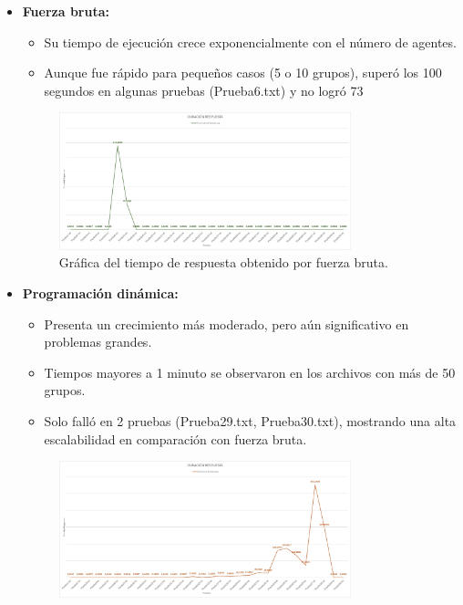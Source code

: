 \documentclass[11pt,letter]{article}
\begin{document}
    \begin{itemize}
        \item \textbf{Fuerza bruta:}
        \begin{itemize}
            \item Su tiempo de ejecución crece exponencialmente con el número de agentes.
            \item Aunque fue rápido para pequeños casos (5 o 10 grupos), superó los 100 segundos en algunas pruebas (Prueba6.txt) y no logró 73%
        \end{itemize}
        \begin{figure}[H]
            \centering
            \includegraphics[width=0.8\textwidth]{resources/tiempo2.jpeg}
            \caption{Gráfica del tiempo de respuesta obtenido por fuerza bruta.}
        \end{figure}
        \item \textbf{Programación dinámica:}
        \begin{itemize}
            \item Presenta un crecimiento más moderado, pero aún significativo en problemas grandes.
            \item Tiempos mayores a 1 minuto se observaron en los archivos con más de 50 grupos.
            \item Solo falló en 2 pruebas (Prueba29.txt, Prueba30.txt), mostrando una alta escalabilidad en comparación con fuerza bruta.
        \end{itemize}
        \begin{figure}[H]
            \centering
            \includegraphics[width=0.8\textwidth]{resources/tiempo3.jpeg}

\end{figure}
\end{itemize}
\end{document}

